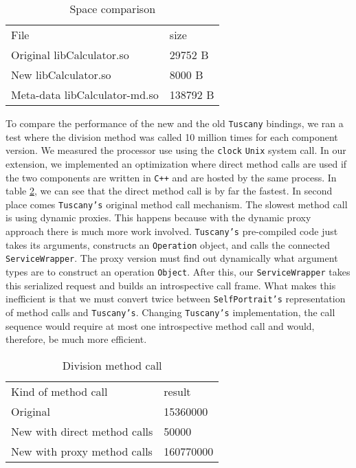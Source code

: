 \begin{table}[ht]
\centering
\caption{Space comparison}
\label{tab:table1}
\begin{tabular}{ll}
\hline\noalign{\smallskip}
File & size\\
\noalign{\smallskip}
\hline
\noalign{\smallskip}
Original libCalculator.so & 29752 B\\
New libCalculator.so & 8000 B\\
Meta-data libCalculator-md.so & 138792 B\\
\hline
\end{tabular}
\end{table}

To compare the performance of the new and the old \texttt{Tuscany} bindings, we ran a test where the
division method was called 10 million times for each component version. We measured the processor use
using the \texttt{clock} \texttt{Unix} system call. In our extension, we implemented an optimization where
direct method calls are used if the two components are written in \texttt{C++} and are hosted by the same
process. In table \ref{tab:table2}, we can see that the direct method call is by far the fastest. In second
place comes \texttt{Tuscany's} original method call mechanism. The slowest method call is using dynamic proxies.
This happens because with the dynamic proxy approach there is much more work involved. \texttt{Tuscany's}
pre-compiled code just takes its arguments, constructs an \texttt{Operation} object, and calls the connected
\texttt{ServiceWrapper}. The proxy version must find out dynamically what argument types are to construct
an operation \texttt{Object}. After this, our \texttt{ServiceWrapper} takes this serialized request and
builds an introspective call frame. What makes this inefficient is that we must convert twice between \texttt{SelfPortrait's}
representation of method calls and \texttt{Tuscany's}. Changing \texttt{Tuscany's} implementation, the call sequence would
require at most one introspective method call and would, therefore, be much more efficient.

\begin{table}[ht]
\centering
\caption{Division method call}
\label{tab:table2}
\begin{tabular}{ll}
\hline\noalign{\smallskip}
Kind of method call & result\\
\noalign{\smallskip}
\hline
\noalign{\smallskip}
Original & 15360000\\
New with direct method calls & 50000\\
New with proxy method calls & 160770000\\
\hline
\end{tabular}

\end{table}


